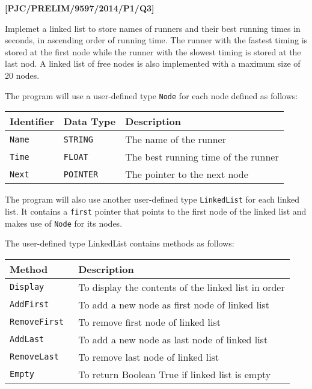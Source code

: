 \documentclass{article}
\begin{document}

\textbf{{[}PJC/PRELIM/9597/2014/P1/Q3{]} }

Implemet a linked list to store names of runners and their best running
times in seconds, in ascending order of running time. The runner with
the fastest timing is stored at the first node while the runner with
the slowest timing is stored at the last nod. A linked list of free
nodes is also implemented with a maximum size of 20 nodes. 

The program will use a user-defined type \texttt{Node} for each node
defined as follows: 
\begin{center}
\begin{tabular}{|l|l|l|}
\hline 
\texttt{\textbf{\hspace{0.01\columnwidth}}}\textbf{Identifier} & \texttt{\textbf{\hspace{0.01\columnwidth}}}\textbf{Data Type} & \texttt{\textbf{\hspace{0.05\columnwidth}}}\textbf{Description}\tabularnewline
\hline 
\texttt{Name} & \texttt{STRING} & The name of the runner\tabularnewline
\hline 
\texttt{Time} & \texttt{FLOAT} & The best running time of the runner\tabularnewline
\hline 
\texttt{Next} & \texttt{POINTER} & The pointer to the next node \tabularnewline
\hline 
\end{tabular}
\par\end{center}

The program will also use another user-defined type \texttt{LinkedList}
for each linked list. It contains a \texttt{first} pointer that points
to the first node of the linked list and makes use of \texttt{Node}
for its nodes. 

The user-defined type LinkedList contains methods as follows: 
\begin{center}
\begin{tabular}{|l|l|}
\hline 
\texttt{\textbf{\hspace{0.01\columnwidth}}}\textbf{Method} & \texttt{\textbf{\hspace{0.05\columnwidth}}}\textbf{Description}\tabularnewline
\hline 
\texttt{Display } & To display the contents of the linked list in order \tabularnewline
\hline 
\texttt{AddFirst } & To add a new node as first node of linked list\tabularnewline
\hline 
\texttt{RemoveFirst } & To remove first node of linked list\tabularnewline
\hline 
\texttt{AddLast} & To add a new node as last node of linked list \tabularnewline
\hline 
\texttt{RemoveLast} & To remove last node of linked list\tabularnewline
\hline 
\texttt{Empty} & To return Boolean True if linked list is empty\tabularnewline
\hline 
\end{tabular}
\par\end{center}
\end{document}
